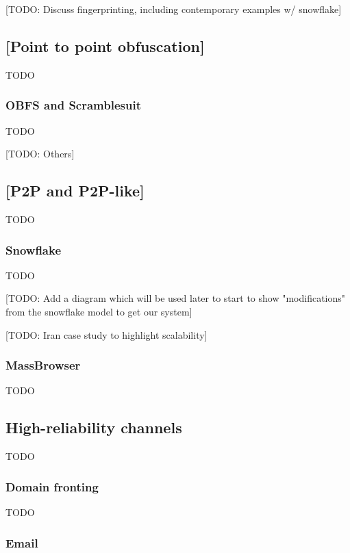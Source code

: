 \documentclass[12pt]{report}
\begin{document}
[TODO: Discuss fingerprinting, including contemporary examples w/ snowflake]

\subsection{[Point to point obfuscation]}

TODO

\subsubsection{OBFS and Scramblesuit}

TODO

[TODO: Others]

\subsection{[P2P and P2P-like]}

TODO

\subsubsection{Snowflake}

TODO

[TODO: Add a diagram which will be used later to start to show "modifications" from the snowflake model to get our system]

[TODO: Iran case study to highlight scalability]

\subsubsection{MassBrowser}

TODO

\subsection{High-reliability channels}

TODO

\subsubsection{Domain fronting}

TODO

\subsubsection{Email}
\end{document}

